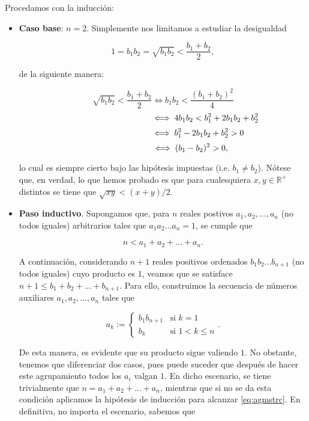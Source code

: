 \documentclass{article}
\begin{document}
\begin{itemize}
    Procedamos con la inducción:

    \begin{itemize}
        \item \textbf{Caso base}: $n = 2$. Simplemente nos limitamos a estudiar la desigualdad
        
        \[1 = b_1b_2 = \sqrt{b_1b_2} < \frac{b_1 + b_2}{2},\]

        de la siguiente manera:

        \[\sqrt{b_1b_2} < \frac{b_1 + b_2}{2} \iff b_1b_2 < \frac{(b_1 + b_2)^2}{4}\]
        \[\hspace{100px} \iff 4b_1b_2 < b_1^2 + 2b_1b_2 + b_2^2\]
        \[\hspace{83px}\iff b_1^2 - 2b_1b_2 + b_2^2 > 0\]
        \[\hspace{65px}\iff (b_1 - b_2)^2 > 0,\]

        lo cual es siempre cierto bajo las hipótesis impuestas (i.e. $b_1 \neq b_2$). Nótese que, en verdad, lo que hemos probado es que para cualesquiera $x, y \in \mathbb{R}^+$ distintos se tiene que $\sqrt{xy} < (x + y) / 2$.

        \item \textbf{Paso inductivo}. Supongamos que, para $n$ reales postivos $a_1, a_2, ..., a_n$ (no todos iguales) arbitrarios tales que $a_1a_2...a_n = 1$, se cumple que
        
        \begin{equation}
            n < a_1 + a_2 + ... + a_n.
            \label{eq:agmstrc}
        \end{equation}

        A continuación, considerando $n + 1$ reales positivos ordenados $b_1b_2...b_{n+1}$ (no todos iguales) cuyo producto es $1$, veamos que se satisface $n + 1 \leq b_1 + b_2 + ... + b_{n + 1}$. Para ello, construimos la secuencia de números auxiliares $a_1, a_2, ..., a_n$ tales que

        \[
        a_k := 
        \begin{cases}
            b_1b_{n + 1} & \text{si $k = 1$} \\
            b_k & \text{si $1 < k \leq n$}
        \end{cases}
        .\]

        De esta manera, es evidente que su producto sigue valiendo $1$. No obstante, tenemos que diferenciar dos casos, pues puede suceder que después de hacer este
        agrupamiento todos los $a_i$ valgan $1$. En dicho escenario, se tiene trivialmente que $n = a_1 + a_2 + ... + a_n$, mientras que si no se da esta condición aplicamos 
        la hipótesis de inducción para alcanzar \eqref{eq:agmstrc}. En definitiva, no importa el escenario, sabemos que


\end{itemize}
\end{itemize}
\end{document}
